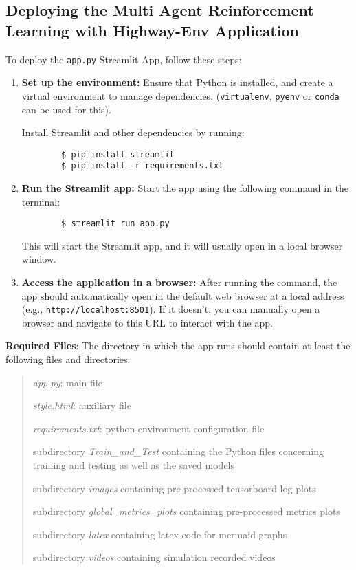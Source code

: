 \subsection*{Deploying the Multi Agent Reinforcement Learning with Highway-Env Application}

To deploy the \texttt{app.py} Streamlit App, follow these steps:

\begin{enumerate}
    \item \textbf{Set up the environment:} Ensure that Python is installed, and create a virtual environment to manage dependencies.
    (\texttt{virtualenv}, \texttt{pyenv} or \texttt{conda} can be used for this).
    
    Install Streamlit and other dependencies by running:
    \begin{verbatim}
        $ pip install streamlit
        $ pip install -r requirements.txt
    \end{verbatim}
        
    
    \item \textbf{Run the Streamlit app:} Start the app using the following command in the terminal:
    
    \begin{verbatim}
        $ streamlit run app.py
    \end{verbatim}

    This will start the Streamlit app, and it will usually open in a local browser window.

    \item \textbf{Access the application in a browser:} After running the command, the app should automatically open in the default web browser at a local address (e.g., \texttt{http://localhost:8501}). If it doesn't, you can manually open a browser and navigate to this URL to interact with the app.
\end{enumerate}



\textbf{Required Files}: The directory in which the app runs should contain at least the following files and directories:

\begin{quote}
    \textit{app.py}: main file

    \textit{style.html}: auxiliary file

    \textit{requirements.txt}: python environment configuration file

    subdirectory \textit{Train\_and\_Test} containing the Python files concerning training and testing as well as the saved models

    subdirectory \textit{images} containing pre-processed tensorboard log plots 

    subdirectory \textit{global\_metrics\_plots} containing pre-processed metrics plots 

    subdirectory \textit{latex} containing latex code for mermaid graphs
    
    subdirectory \textit{videos} containing simulation recorded videos 


\end{quote}
    

